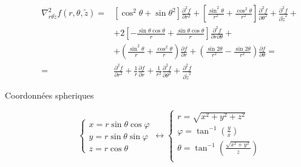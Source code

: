 \documentclass
[
a4paper,                      %
twoside,					  %
12pt,                         %
abstract,		      %
fleqn,                        %
]
{scrartcl} %
\begin{document}
\begin{description}
\begin{equation}
\begin{aligned}
\nabla_{r\theta\tilde{z}}^{2}f\left(r,\theta,\tilde{z}\right)=&\left[\cos^{2}{\theta}+\sin{\theta}^{2}\right]\frac{\partial^{2} f}{\partial r^{2}}+\left[\frac{\sin^{2}{\theta}}{r^{2}}+\frac{\cos^{2}{\theta}}{r^{2}}\right]\frac{\partial^{2} f}{\partial\theta^{2}}+\frac{\partial^{2} f}{\partial\tilde{z}^{2}}+\\[5pt]
&+2\left[-\frac{\sin{\theta}\cos{\theta}}{r}+\frac{\sin{\theta}\cos{\theta}}{r}\right]\frac{\partial^{2} f}{\partial r\partial\theta}+\\[5pt]
&+\left(\frac{\sin^{2}{\theta}}{r}+\frac{\cos^{2}{\theta}}{r}\right)\frac{\partial f}{\partial r}+\left(\frac{\sin{2\theta}}{r^{2}}-\frac{\sin{2\theta}}{r^{2}}\right)\frac{\partial f}{\partial\theta}=\\[5pt]
=&\frac{\partial^{2} f}{\partial r^{2}}+\frac{1}{r}\frac{\partial f}{\partial r}+\frac{1}{r^{2}}\frac{\partial^{2} f}{\partial\theta^{2}}+\frac{\partial^{2} f}{\partial\tilde{z}^{2}}
\end{aligned}
\end{equation}

\item[Coordonn\'ees spheriques]

\begin{equation}
\begin{cases}
x=r\sin{\theta}\cos{\varphi}\\
y=r\sin{\theta}\sin{\varphi}\\
z=r\cos{\theta}
\end{cases}\longleftrightarrow\begin{cases}
r=\sqrt{x^{2}+y^{2}+z^{2}}\\
\varphi=\tan^{-1}\left(\frac{y}{x}\right)\\
\theta=\tan^{-1}\left(\frac{\sqrt{x^{2}+y^{2}}}{z}\right)\\
\end{cases}
\end{equation}


\end{description}
\end{document}
